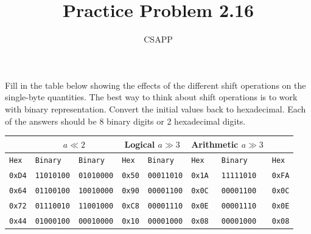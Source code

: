 \documentclass{article}
\title{Practice Problem 2.16}
\author{CSAPP}
\begin{document}
	\maketitle

	\begin{flushleft}
		Fill in the table below showing the effects of the different
		shift operations on the single-byte quantities. The best way to think
		about shift operations is to work with binary representation. Convert
		the initial values back to hexadecimal. Each of the answers should
		be 8 binary digits or 2 hexadecimal digits.
	\end{flushleft}

	\begin{center}
		\setlength{\tabcolsep}{4pt}
		\renewcommand{\arraystretch}{2}
		\begin{tabular}{|p{1.0cm}|p{2.1cm}|p{2.1cm}|p{1.0cm}|p{2.1cm}|p{1.0cm}|p{2.1cm}|p{1.0cm}|}
			\hline
			\rowcolor{headergreen}
			\multicolumn{2}{|c|}{$a$}                 &
			\multicolumn{2}{c|}{$a \ll 2$}            &
			\multicolumn{2}{c|}{Logical $a \gg 3$}    &
			\multicolumn{2}{c|}{Arithmetic $a \gg 3$} \\
			\hline
			\texttt{Hex} & \texttt{Binary} & \texttt{Binary} & \texttt{Hex} &
			\texttt{Binary} & \texttt{Hex} & \texttt{Binary} & \texttt{Hex}  \\
			\hline
			\texttt{0xD4} & \texttt{11010100} & \texttt{01010000} & \texttt{0x50} & \texttt{00011010} & \texttt{0x1A} & \texttt{11111010} & \texttt{0xFA} \\
			\hline
			\texttt{0x64} & \texttt{01100100} & \texttt{10010000} & \texttt{0x90} & \texttt{00001100} & \texttt{0x0C} & \texttt{00001100} & \texttt{0x0C} \\
			\hline
			\texttt{0x72} & \texttt{01110010} & \texttt{11001000} & \texttt{0xC8} & \texttt{00001110} & \texttt{0x0E} & \texttt{00001110} & \texttt{0x0E} \\
			\hline
			\texttt{0x44} & \texttt{01000100} & \texttt{00010000} & \texttt{0x10} & \texttt{00001000} & \texttt{0x08} & \texttt{00001000} & \texttt{0x08} \\
			\hline
		\end{tabular}
	\end{center}
\end{document}
